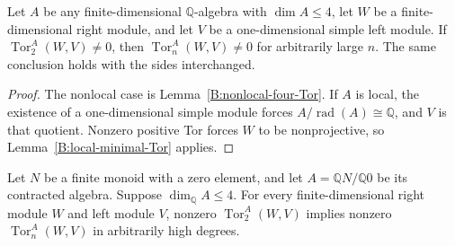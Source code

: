\begin{corollary}
\label{B:four-dimensional-simple-target}
Let $A$ be any finite-dimensional $\mathbb Q$-algebra with
$\dim A\leq4$, let $W$ be a finite-dimensional right module, and
let $V$ be a one-dimensional simple left module.
If $\operatorname{Tor}_2^A(W,V)\ne0$, then
$\operatorname{Tor}_n^A(W,V)\ne0$ for arbitrarily large $n$.
The same conclusion holds with the sides interchanged.
\end{corollary}

\begin{proof}
The nonlocal case is Lemma~\ref{B:nonlocal-four-Tor}.
If $A$ is local, the existence of a one-dimensional simple module
forces $A/\operatorname{rad}(A)\cong\mathbb Q$, and $V$ is that
quotient.  Nonzero positive Tor forces $W$ to be nonprojective,
so Lemma~\ref{B:local-minimal-Tor} applies.
\end{proof}



\begin{theorem}
\label{B:contracted-four-Tor}
Let $N$ be a finite monoid with a zero element, and let
$A=\mathbb QN/\mathbb Q0$ be its contracted algebra.  Suppose
$\dim_{\mathbb Q}A\leq4$.
For every finite-dimensional right module $W$ and left module $V$,
nonzero $\operatorname{Tor}_2^A(W,V)$ implies nonzero
$\operatorname{Tor}_n^A(W,V)$ in arbitrarily high degrees.
\end{theorem}


